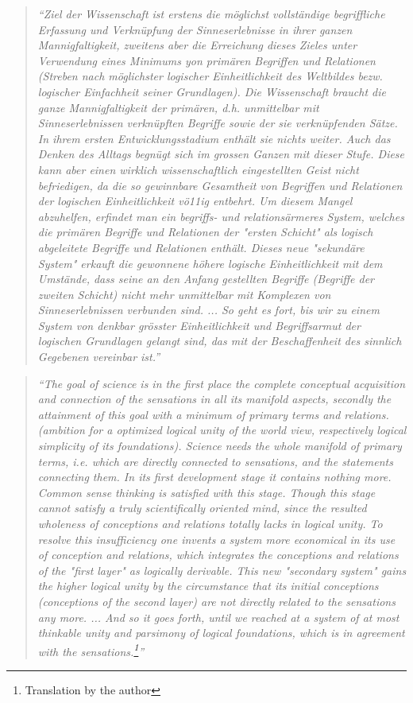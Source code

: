 \documentclass{article}
\begin{document}
\begin{quote}
\textit{``Ziel der Wissenschaft ist erstens die m\"oglichst vollst\"andige begriffliche Erfassung und Verkn\"upfung der Sinneserlebnisse in ihrer ganzen Mannigfaltigkeit, zweitens aber die Erreichung dieses Zieles unter Verwendung eines Minimums yon prim\"aren Begriffen und Relationen (Streben nach m\"oglichster logischer
Einheitlichkeit des Weltbildes bezw. logischer Einfachheit seiner Grundlagen).
Die Wissenschaft braucht die ganze Mannigfaltigkeit der prim\"aren, d.h. unmittelbar mit Sinneserlebnissen verkn\"upften Begriffe sowie der sie verkn\"upfenden S\"atze. In ihrem ersten Entwicklungsstadium enth\"alt sie nichts weiter. 
Auch das Denken des Alltags begn\"ugt sich im grossen Ganzen mit dieser Stufe. Diese kann aber einen wirklich wissenschaftlich eingestellten
Geist nicht befriedigen, da die so gewinnbare Gesamtheit von Begriffen und Relationen der logischen Einheitlichkeit v\"o11ig entbehrt. Um diesem Mangel abzuhelfen, erfindet man ein begriffs- und relations\"armeres System, welches
die prim\"aren Begriffe und Relationen der "ersten Schicht" als
logisch abgeleitete Begriffe und Relationen enth\"alt. Dieses neue "sekund\"are System" erkauft die gewonnene h\"ohere logische Einheitlichkeit mit dem Umst\"ande, dass seine an den Anfang gestellten Begriffe (Begriffe der zweiten Schicht) nicht
mehr unmittelbar mit Komplexen von Sinneserlebnissen verbunden sind.
... So geht es fort, bis wir zu einem System von denkbar gr\"osster Einheitlichkeit und Begriffsarmut der logischen Grundlagen gelangt sind, das mit der Beschaffenheit des sinnlich Gegebenen vereinbar ist.''}
\end{quote}

\begin{quote}
\textit{``The goal of science is in the first place the complete conceptual acquisition and connection of the sensations in all its manifold aspects, secondly the attainment of this goal with a minimum of primary terms and relations. (ambition for a optimized logical unity of the world view, respectively logical simplicity of its foundations).
Science needs the whole manifold of primary terms, i.e. which are directly connected to sensations, and the statements connecting them. In its first development stage it contains nothing more. 
Common sense thinking is satisfied with this stage. Though this stage cannot satisfy a truly scientifically oriented mind, since the resulted wholeness of conceptions and relations totally lacks in logical unity. To resolve this insufficiency one invents a system more economical in its use of conception and relations, which integrates the conceptions and relations of the "first layer" as logically derivable. This new "secondary system" gains the higher logical unity by the circumstance that its initial conceptions (conceptions of the second layer) are not directly related to the sensations any more.
...
And so it goes forth, until we reached at a system of at most thinkable unity and parsimony of logical foundations, which is in agreement with the sensations.\footnote{Translation by the author}''}
\end{quote}
\end{document}
